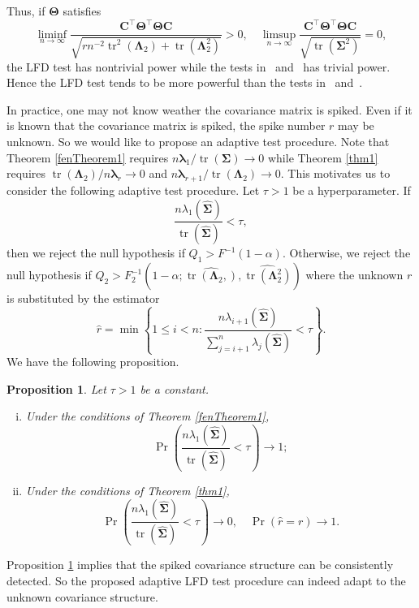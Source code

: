 \documentclass[12pt]{article} %
\DeclareMathOperator{\mytr}{tr}
\newcommand{\bC}{\mathbf{C}}
\newcommand{\bfsym}[1]{\ensuremath{\boldsymbol{#1}}}
\def\blambda {\bfsym {\lambda}}
\def\bLambda {\bfsym {\Lambda}}
\def\bSigma {\bfsym {\Sigma}}
\def\bTheta {\bfsym {\Theta}}
\newtheorem{proposition}{Proposition}
\theoremstyle{definition}
\begin{document}
Thus, if $\bTheta$ satisfies
\begin{equation*}
    \liminf_{n\to \infty}\frac{
    \bC^\top \bTheta^\top \bTheta \bC
}{
    \sqrt{
        rn^{-2} \mytr^2 (\bLambda_2) + \mytr(\bLambda_2^2)
    }
}
>0,
\quad
    \limsup_{n\to \infty}\frac{
    \bC^\top \bTheta^\top \bTheta \bC
}{
    \sqrt{
        \mytr(\bSigma^2)
    }
}
=0,
\end{equation*}
the LFD test has nontrivial power while  the tests in~\cite{Bai1996Efiect} and~\cite{Chen2010A} has trivial power.
Hence the LFD test tends to be more powerful than the tests in~\cite{Bai1996Efiect} and~\cite{Chen2010A}.


In practice, one may not know weather the covariance matrix is spiked. Even if it is known that the covariance matrix is spiked, the spike number $r$ may be unknown.
So we would like to propose an adaptive test procedure.
Note that Theorem \ref{fenTheorem1} requires $n\blambda_1/\mytr(\bSigma)\to 0$ while Theorem \ref{thm1} requires $\mytr(\bLambda_2)/n\blambda_r\to 0$ and $n\blambda_{r+1}/\mytr(\bLambda_2)\to 0$.
This motivates us to consider the following adaptive test procedure.
Let $\tau>1$ be a hyperparameter.
If
\begin{equation*}
    \frac{
        n\lambda_1(\hat{\bSigma})
    }{
\mytr(\hat{\bSigma})}
<\tau,
\end{equation*}
then we reject the null hypothesis if $Q_1 > F^{-1}(1-\alpha)$.
Otherwise, we reject the null hypothesis if $Q_2> F_2^{-1}(1-\alpha;\widehat{\mytr(\bLambda_2,)},\widehat{\mytr(\bLambda_2^2)})$ where the unknown $r$ is substituted by the estimator
\begin{equation*}
    \hat{r}=\min
    \left\{
1\leq i< n:
    \frac{
        n\lambda_{i+1}(\hat{\bSigma})
}
{    
    \sum_{j=i+1}^n
\lambda_j(\hat{\bSigma})}
<
\tau
\right\}
.
\end{equation*}
We have the following proposition.
\begin{proposition}\label{numberConsistency}
    Let $\tau>1$ be a constant.
    \begin{enumerate}[(i)]
        \item 
    Under the conditions of Theorem \ref{fenTheorem1}, 
    \begin{equation*}
        \Pr\left(
    \frac{
        n\lambda_1(\hat{\bSigma})
    }{
    \mytr(\hat{\bSigma})}
<\tau
\right)\to 1
;
    \end{equation*}
\item
    Under the conditions of Theorem \ref{thm1},
    \begin{equation*}
        \Pr\left(
    \frac{
        n\lambda_1(\hat{\bSigma})
    }{
    \mytr(\hat{\bSigma})}
<\tau
\right)\to 0,\quad
\Pr(\hat{r}= r)\to 1
.
    \end{equation*}
    \end{enumerate}
\end{proposition}
Proposition \ref{numberConsistency} implies that the spiked covariance structure can be consistently detected.
So the proposed adaptive LFD test procedure can indeed adapt to the unknown covariance structure.
\end{document}
